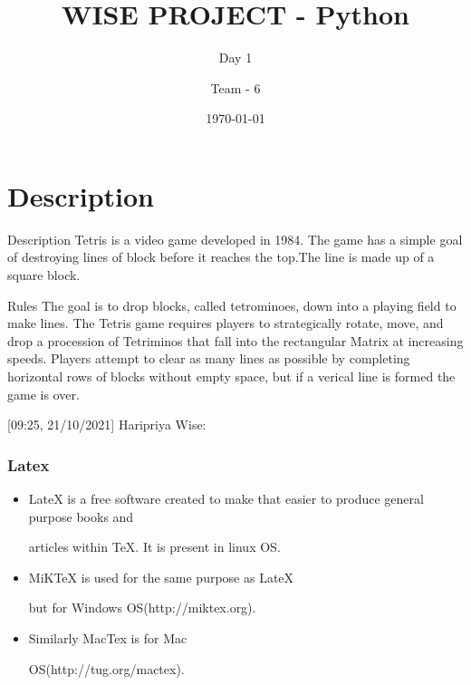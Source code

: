 \documentclass{beamer}
\title{WISE PROJECT - Python}
\subtitle{Day 1}
\author{Team - 6}
\institute{BVRIT HYDERABAD}
\date{\today}
\begin{document}
\begin{frame}
  \titlepage
\end{frame}


\section{Description}
\begin{frame}{Description}
Tetris is a video game developed in 1984. The game has a simple goal of destroying lines of block before it reaches the top.The line is made up of a square block.



\vskip 1cm
\begin{block}{Rules}
The goal is to drop blocks, called tetrominoes, down into a playing field to make lines.
The Tetris game requires players to strategically rotate, move, and drop a procession of Tetriminos that fall into the rectangular Matrix at increasing speeds.
Players attempt to clear as many lines as possible by completing horizontal rows of blocks without empty space, but if a verical line is formed the game is over.

\end{block}

\end{frame}
[09:25, 21/10/2021] Haripriya Wise: \begin{frame}

\frametitle{Latex}

\begin{itemize}

\item LateX is a free software created to make that easier to produce general purpose books and 

articles within TeX. It is present in linux OS. \item MiKTeX is used for the same purpose as LateX 

but for Windows OS(http://miktex.org). \item Similarly MacTex is for Mac 

OS(http://tug.org/mactex).

\end{itemize}

\end{frame}
\end{document}
